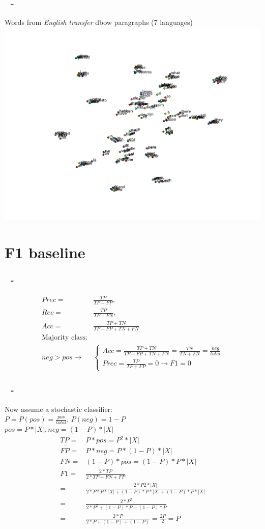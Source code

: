 \documentclass{beamer}
\newenvironment{dia}
{
\begin{frame}[fragile, environment=dia]
\frametitle{\insertsection
\ifx\insertsubsection\empty\else
      \,~-~\insertsubsection             %
   \fi}
}
{
\end{frame}
}
\begin{document}
\begin{dia}
Words from \emph{English transfer} dbow paragraphs (7 languages)
\includegraphics[width=1\linewidth]{figures/transfer_en25freq7}
\end{dia}

\section*{F1 baseline}

\begin{dia}
\begin{align*}
Prec=&\frac{TP}{TP+FP}, \\
Rec=&\frac{TP}{TP+FN}, \\
Acc=&\frac{TP+TN}{TP+FP+TN+FN}\\
\text{Majority class:}\\
 neg>pos\rightarrow& \begin{cases}Acc=\frac{TP+TN}{TP+FP+TN+FN}=\frac{TN}{TN+FN}=\frac{neg}{total}\\Prec=\frac{TP}{TP+FP}=0\rightarrow F1=0\end{cases}
\end{align*}
\end{dia}
\begin{dia}
Now assume a stochastic classifier: \\
$P=P(pos)=\frac{pos}{total}$, $P(neg)=1-P$\\

$pos=P*|X|, neg=(1-P)*|X|$
\begin{align*}
TP=&P*pos=P^2*|X|\\
FP=&P*neg=P*(1-P)*|X|\\
FN=&(1-P)*pos=(1-P)*P*|X|\\
F1=&\frac{2*TP}{2*TP+FN+FP}\\
=&\frac{2*P2*|X|}{2*P*P*|X|+(1-P)*P*|X|+(1-P)*P*|X|}\\
=&\frac{2*P^2}{2*P^2+(1-P)*P+(1-P)*P}\\
=&\frac{2*P}{2*P+(1-P)+(1-P)}=\frac{2P}{2}=P\\
\end{align*}
\end{dia}
\end{document}
